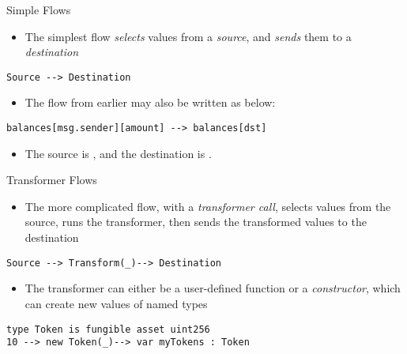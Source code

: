 \documentclass[leqno,presentation,usenames,dvipsnames]{beamer}
\begin{document}
\begin{frame}[fragile]{Simple Flows}
    \begin{itemize}
        \item The simplest flow \emph{selects} values from a \emph{source}, and \emph{sends} them to a \emph{destination}
    \end{itemize}
\begin{lstlisting}[language=flow, basicstyle=\normalsize\ttfamily]
Source --> Destination
\end{lstlisting}
    \begin{itemize}
        \item The flow from earlier may also be written as below:
    \end{itemize}
\begin{lstlisting}[language=flow, basicstyle=\normalsize\ttfamily]
balances[msg.sender][amount] --> balances[dst]
\end{lstlisting}
    \begin{itemize}
        \item The source is , and the destination is .
    \end{itemize}
\end{frame}

\begin{frame}[fragile]{Transformer Flows}
    \begin{itemize}
        \item The more complicated flow, with a \emph{transformer call}, selects values from the source, runs the transformer, then sends the transformed values to the destination
    \end{itemize}
\begin{lstlisting}[language=flow, basicstyle=\normalsize\ttfamily]
Source --> Transform(_)--> Destination
\end{lstlisting}
    \begin{itemize}
        \item The transformer can either be a user-defined function or a \emph{constructor}, which can create new values of named types
    \end{itemize}
\begin{lstlisting}[language=flow, basicstyle=\normalsize\ttfamily]
type Token is fungible asset uint256
10 --> new Token(_)--> var myTokens : Token
\end{lstlisting}
\end{frame}
\end{document}
